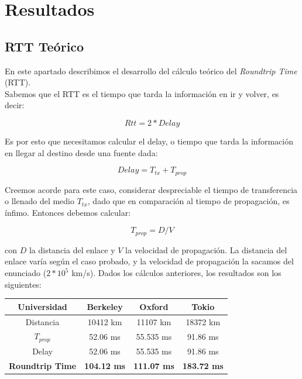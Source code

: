 \section{Resultados}

\subsection{RTT Teórico}

En este apartado describimos el desarrollo del cálculo teórico del \textit{Roundtrip Time} (RTT).
\\
Sabemos que el RTT es el tiempo que tarda la información en ir y volver, es decir:

\begin{equation}
	Rtt = 2 * Delay
\end{equation}

Es por esto que necesitamos calcular el delay, o tiempo que tarda la información en llegar al destino desde una fuente dada:

\begin{equation}
	Delay = T_{tx} + T_{prop}
\end{equation}

Creemos acorde para este caso, considerar despreciable el tiempo de transferencia o llenado del medio $T_{tx}$, dado que en comparación al tiempo de propagación, es ínfimo. Entonces debemos calcular:

\begin{equation}
	T_{prop} = D/V
\end{equation}

con $D$ la distancia del enlace y $V$ la velocidad de propagación. La distancia del enlace varía según el caso probado, y la velocidad de propagación la sacamos del enunciado ($2*10^5$ km/s). Dados los cálculos anteriores, los resultados son los siguientes:\\

\begin{center}
\begin{tabular}{| c | c | c | c |} \hline
	Universidad		&	\textbf{Berkeley}		&	\textbf{Oxford}		&	\textbf{Tokio}		\\ \hline
	Distancia		&	10412 km		&	11107 km		&	18372 km		\\ \hline
	$T_{prop}$		&	52.06 ms	&	55.535 ms	&	91.86 ms	\\ \hline
	Delay			&	52.06 ms	&	55.535 ms	&	91.86 ms	\\ \hline
	\textbf{Roundtrip Time}	&	\textbf{104.12 ms}	&	\textbf{111.07 ms}	&	\textbf{183.72 ms}	\\ \hline
\end{tabular}
\end{center}

